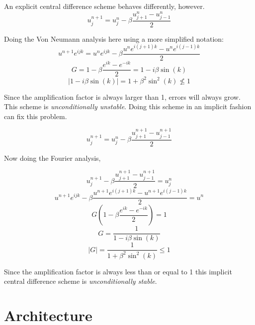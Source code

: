 \documentclass[12pt,upcase]{umlthesis}
\begin{document}
An explicit central difference scheme behaves differently, however.
\begin{equation}\label{eq:central}
	u^{n+1}_j = u^n_j - \beta \frac{u^n_{j+1}-u^n_{j-1}}{2}
\end{equation}

Doing the Von Neumann analysis here using a more simplified notation:
\begin{equation}
	u^{n+1} e^{ijk} = u^n e^{ijk} - \beta \frac{u^n e^{i(j+1)k} - u^n e^{i(j-1)k}}{2}
\end{equation}
\begin{equation}
	G = 1 - \beta \frac{e^{ik} - e^{-ik}}{2} = 1 - i\beta \sin{(k)}
\end{equation}
\begin{equation}
	\lvert 1 - i\beta \sin{(k)} \rvert = 1 + \beta^2 \sin^2(k) \nleq 1
\end{equation}

Since the amplification factor is always larger than 1, errors will always grow. This scheme is {\it unconditionally unstable}. Doing this scheme in an implicit fashion can fix this problem.

\begin{equation}\label{eq:implicitcentral}
	u^{n+1}_j = u^n_j - \beta \frac{u^{n+1}_{j+1}-u^{n+1}_{j-1}}{2}
\end{equation}

Now doing the Fourier analysis,

\begin{equation}
	u^{n+1}_j - \beta \frac{u^{n+1}_{j+1}-u^{n+1}_{j-1}}{2} = u^n_j
\end{equation}
\begin{equation}
	u^{n+1}e^{ijk} - \beta \frac{u^{n+1}e^{i(j+1)k}-u^{n+1}e^{i(j-1)k}}{2} = u^n
\end{equation}
\begin{equation}
	G (1 - \beta \frac{e^{ik}-e^{-ik}}{2}) = 1
\end{equation}
\begin{equation}
	G  = \frac{1}{1 - i \beta \sin{(k)}} 
\end{equation}
\begin{equation}
\lvert G \rvert = \frac{1}{1+\beta^2 \sin^2{(k)}} \leq 1
\end{equation}

Since the amplification factor is always less than or equal to 1 this implicit central difference scheme is {\it unconditionally stable}.

\section{Architecture}\label{sec:architecture}
\end{document}
